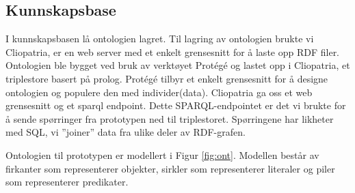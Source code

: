 \subsection{Kunnskapsbase}
\label{chap:kunnskapsbasedesign}
I kunnskapsbasen lå ontologien lagret. Til lagring av ontologien brukte vi Cliopatria, er en web server med et enkelt grensesnitt for å laste opp RDF filer.  Ontologien ble bygget ved bruk av verktøyet Protégé og lastet opp i Cliopatria, et triplestore basert på prolog. Protégé tilbyr et enkelt grensesnitt for å designe ontologien og populere den med individer(data). Cliopatria ga oss et web grensesnitt og et \gls{sparql} endpoint. Dette SPARQL-endpointet er det vi brukte for å sende spørringer fra prototypen ned til triplestoret. Spørringene har likheter med SQL, vi ''joiner'' data fra ulike deler av RDF-grafen.

Ontologien til prototypen er modellert i Figur \ref{fig:ont}. Modellen består av firkanter som representerer objekter, sirkler som representerer literaler og piler som representerer predikater. 

